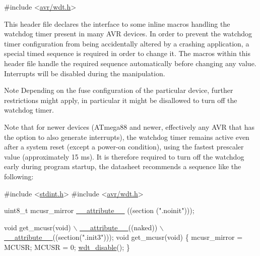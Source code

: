 \begin{DoxyCode}
\textcolor{preprocessor}{#include <\hyperlink{wdt_8h}{avr/wdt.h}>} 
\end{DoxyCode}


This header file declares the interface to some inline macros handling the watchdog timer present in many A\+VR devices. In order to prevent the watchdog timer configuration from being accidentally altered by a crashing application, a special timed sequence is required in order to change it. The macros within this header file handle the required sequence automatically before changing any value. Interrupts will be disabled during the manipulation.

\begin{DoxyNote}{Note}
Depending on the fuse configuration of the particular device, further restrictions might apply, in particular it might be disallowed to turn off the watchdog timer.
\end{DoxyNote}
Note that for newer devices (A\+Tmega88 and newer, effectively any A\+VR that has the option to also generate interrupts), the watchdog timer remains active even after a system reset (except a power-\/on condition), using the fastest prescaler value (approximately 15 ms). It is therefore required to turn off the watchdog early during program startup, the datasheet recommends a sequence like the following\+:


\begin{DoxyCode}
\textcolor{preprocessor}{#include <\hyperlink{stdint_8h}{stdint.h}>}
\textcolor{preprocessor}{#include <\hyperlink{wdt_8h}{avr/wdt.h}>}

uint8\_t mcusr\_mirror \hyperlink{stdint_8h_a772744ca0816d59e120b8f8a1ede64f0}{\_\_attribute\_\_} ((section (\textcolor{stringliteral}{".noinit"})));

\textcolor{keywordtype}{void} get\_mcusr(\textcolor{keywordtype}{void}) \hyperlink{stdint_8h_a772744ca0816d59e120b8f8a1ede64f0}{\(\backslash\)}
\hyperlink{stdint_8h_a772744ca0816d59e120b8f8a1ede64f0}{  \_\_attribute\_\_}((naked)) \hyperlink{stdint_8h_a772744ca0816d59e120b8f8a1ede64f0}{\(\backslash\)}
\hyperlink{stdint_8h_a772744ca0816d59e120b8f8a1ede64f0}{  \_\_attribute\_\_}((section(\textcolor{stringliteral}{".init3"})));
\textcolor{keywordtype}{void} get\_mcusr(\textcolor{keywordtype}{void})
\{
  mcusr\_mirror = MCUSR;
  MCUSR = 0;
  \hyperlink{group__avr__watchdog_gab3784e1b871d61ed338da5658184b725}{wdt\_disable}();
\}
\end{DoxyCode}


